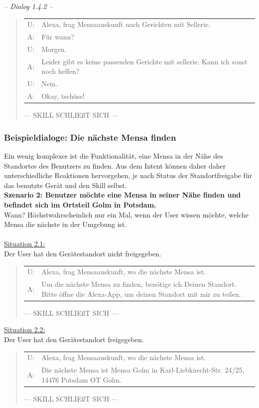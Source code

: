 \documentclass[12pt]{article}
\begin{document}
\emph{-- Dialog 1.4.2 --}
\begin{quote}
\begin{tabular}{lp{12cm}}
  U:& Alexa, frag Mensaauskunft nach Gerichten mit Sellerie.\\
  A:& Für wann?\\
  U:& Morgen.\\
  A:& Leider gibt es keine passenden  Gerichte mit sellerie. Kann ich sonst noch helfen?\\
  U:& Nein.\\
  A:& Okay, tschüss!\\[0.2cm]
\end{tabular}
--- SKILL SCHLIEßT SICH ---\\
\end{quote}

\subsubsection{Beispieldialoge: Die nächste Mensa finden}
Ein wenig komplexer ist die Funktionalität, eine Mensa in der Nähe des Standortes des Benutzers zu finden.
Aus dem Intent können daher daher unterschiedliche Reaktionen hervorgehen, je nach Status der Standortfreigabe für das benutzte Gerät und den Skill selbst.\\

\textbf{Szenario 2: Benutzer möchte eine Mensa in seiner Nähe finden und befindet sich im Ortsteil Golm in Potsdam.}\\
Wann? Höchstwahrscheinlich nur ein Mal, wenn der User wissen möchte, welche Mensa die nächste in der Umgebung ist.\\~\\
\ul{Situation 2.1:}\\Der User hat den Gerätestandort nicht freigegeben.
\begin{quote}
\begin{tabular}{lp{12cm}}
  U:& Alexa, frag Mensaauskunft, wo die nächste Mensa ist.\\
  A:& Um die nächste Mensa zu finden, benötige ich Deinen Standort. Bitte öffne die Alexa-App, um deinen Standort mit mir zu teilen.\\[0.2cm]
\end{tabular}
--- SKILL SCHLIEßT SICH ---\\
\end{quote}

\ul{Situation 2.2:}\\Der User hat den Gerätestandort freigegeben.
\begin{quote}
\begin{tabular}{lp{12cm}}
  U:& Alexa, frag Mensaauskunft, wo die nächste Mensa ist.\\
  A:& Die nächste Mensa ist Mensa Golm in Karl-Liebknecht-Str. 24/25, 14476 Potsdam OT Golm.\\[0.2cm]
\end{tabular}
--- SKILL SCHLIEßT SICH ---\\
\end{quote}
\end{document}
